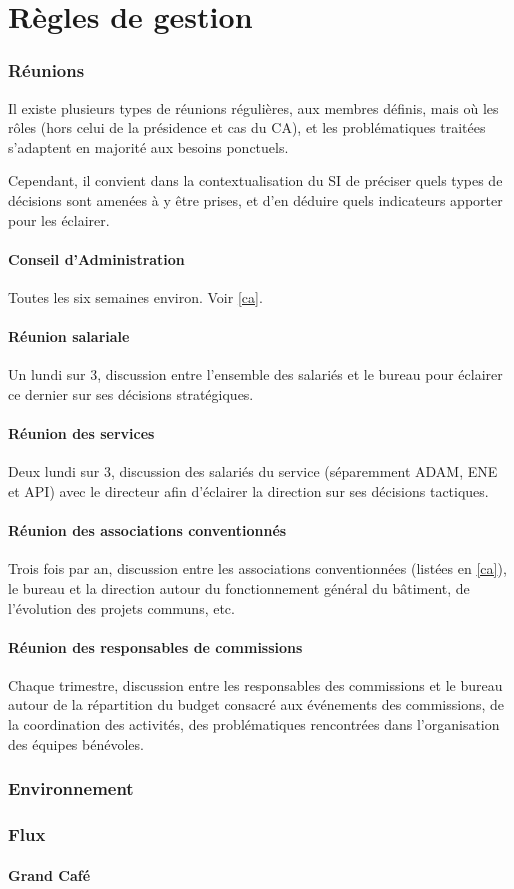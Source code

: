 \section{Règles de gestion}
\label{gestion}

\subsubsection{Réunions}

Il existe plusieurs types de réunions régulières, aux membres définis,
mais où les rôles (hors celui de la présidence et cas du CA),
et les problématiques traitées s'adaptent en majorité aux besoins ponctuels.

Cependant, il convient dans la contextualisation du SI de préciser quels types
de décisions sont amenées à y être prises, et d'en déduire quels indicateurs
apporter pour les éclairer.

\paragraph{Conseil d'Administration} Toutes les six semaines environ.
Voir \ref{ca}.

\paragraph{Réunion salariale} Un lundi sur 3, discussion entre l'ensemble
des salariés et le bureau pour éclairer ce dernier sur ses
décisions stratégiques.

\paragraph{Réunion des services} Deux lundi sur 3, discussion des
salariés du service (séparemment ADAM, ENE et API) avec le directeur
afin d'éclairer la direction sur ses décisions tactiques.

\paragraph{Réunion des associations conventionnés} Trois fois par an,
discussion entre les associations conventionnées (listées en \ref{ca}),
le bureau et la direction autour du fonctionnement général du bâtiment,
de l'évolution des projets communs, etc.

\paragraph{Réunion des responsables de commissions} Chaque trimestre,
discussion entre les responsables des commissions et le bureau
autour de la répartition du budget consacré aux événements des commissions,
de la coordination des activités, des problématiques rencontrées dans
l'organisation des équipes bénévoles.

\subsubsection{Environnement}
\subsubsection{Flux}
\paragraph{Grand Café}
